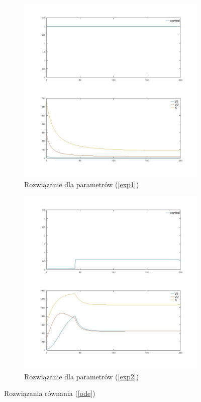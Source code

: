 \documentclass[11pt]{article}
\begin{document}
\begin{figure}[h]
  \begin{subfigure}{.5\textwidth}
    \caption{Rozwiązanie dla parametrów (\ref{exp1})}\label{max_sol}
    \includegraphics[width=\textwidth]{../plots/plot_max}
  \end{subfigure}
    \begin{subfigure}{.5\textwidth}
    \caption{Rozwiązanie dla parametrów (\ref{exp2})}\label{bang_sol}
    \includegraphics[width=\textwidth]{../plots/plot_bang}
  \end{subfigure}%
  \caption{Rozwiązania równania (\ref{ode})}\label{ode_sol}
\end{figure}
\end{document}
